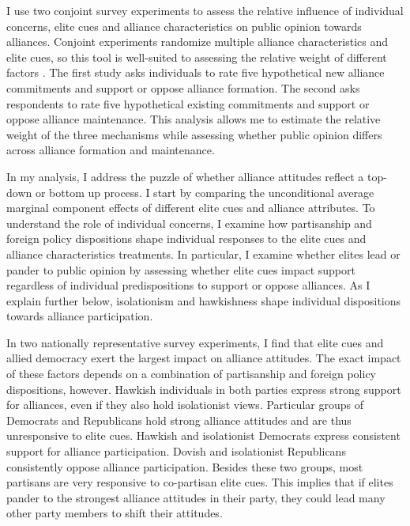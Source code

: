 \documentclass[12pt]{article}
\begin{document}
I use two conjoint survey experiments to assess the relative influence of individual concerns, elite cues and alliance characteristics on public opinion towards alliances. 
Conjoint experiments randomize multiple alliance characteristics and elite cues, so this tool is well-suited to assessing the relative weight of different factors \citep{Hainmuelleretal2014}.
The first study asks individuals to rate five hypothetical new alliance commitments and support or oppose alliance formation.
The second asks respondents to rate five hypothetical existing commitments and support or oppose alliance maintenance. 
This analysis allows me to estimate the relative weight of the three mechanisms while assessing whether public opinion differs across alliance formation and maintenance.  


In my analysis, I address the puzzle of whether alliance attitudes reflect a top-down or bottom up process. 
I start by comparing the unconditional average marginal component effects of different elite cues and alliance attributes.
To understand the role of individual concerns, I examine how partisanship and foreign policy dispositions shape individual responses to the elite cues and alliance characteristics treatments. 
In particular, I examine whether elites lead or pander to public opinion by assessing whether elite cues impact support regardless of individual predispositions to support or oppose alliances.
As I explain further below, isolationism and hawkishness shape individual dispositions towards alliance participation. 


In two nationally representative survey experiments, I find that elite cues and allied democracy exert the largest impact on alliance attitudes. 
The exact impact of these factors depends on a combination of partisanship and foreign policy dispositions, however. 
Hawkish individuals in both parties express strong support for alliances, even if they also hold isolationist views.
Particular groups of Democrats and Republicans hold strong alliance attitudes and are thus unresponsive to elite cues.
Hawkish and isolationist Democrats express consistent support for alliance participation.
Dovish and isolationist Republicans consistently oppose alliance participation. 
Besides these two groups, most partisans are very responsive to co-partisan elite cues. 
This implies that if elites pander to the strongest alliance attitudes in their party, they could lead many other party members to shift their attitudes. 
\end{document}
